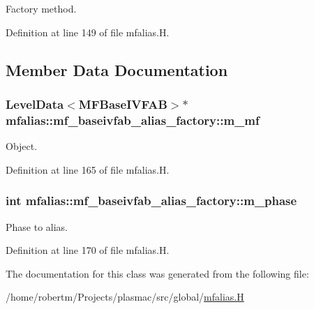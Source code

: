 Factory method. 



Definition at line 149 of file mfalias.\+H.



\subsection{Member Data Documentation}
\subsubsection[{\texorpdfstring{m\+\_\+mf}{m_mf}}]{\setlength{\rightskip}{0pt plus 5cm}Level\+Data$<${\bf M\+F\+Base\+I\+V\+F\+AB}$>$$\ast$ mfalias\+::mf\+\_\+baseivfab\+\_\+alias\+\_\+factory\+::m\+\_\+mf\hspace{0.3cm}{\ttfamily [private]}}\hypertarget{classmfalias_1_1mf__baseivfab__alias__factory_aa05431a7faedab1995c964a15ccf7bb5}{}\label{classmfalias_1_1mf__baseivfab__alias__factory_aa05431a7faedab1995c964a15ccf7bb5}


Object. 



Definition at line 165 of file mfalias.\+H.

\subsubsection[{\texorpdfstring{m\+\_\+phase}{m_phase}}]{\setlength{\rightskip}{0pt plus 5cm}int mfalias\+::mf\+\_\+baseivfab\+\_\+alias\+\_\+factory\+::m\+\_\+phase\hspace{0.3cm}{\ttfamily [private]}}\hypertarget{classmfalias_1_1mf__baseivfab__alias__factory_a4d4b4954352a1095f9ac7abb252a5f58}{}\label{classmfalias_1_1mf__baseivfab__alias__factory_a4d4b4954352a1095f9ac7abb252a5f58}


Phase to alias. 



Definition at line 170 of file mfalias.\+H.



The documentation for this class was generated from the following file\+:\begin{DoxyCompactItemize}
\item 
/home/robertm/\+Projects/plasmac/src/global/\hyperlink{mfalias_8H}{mfalias.\+H}\end{DoxyCompactItemize}

